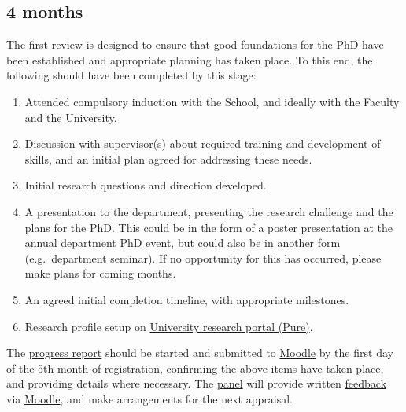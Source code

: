 \documentclass[12pt,a4paper]{article}
\begin{document}
\subsection{4 months} \label{sec:4months}
The first review is designed to ensure that good foundations for the PhD have been established and appropriate planning has taken place. To this end, the following should have been completed by this stage:
\begin{enumerate}
	\item Attended compulsory induction with the School, and ideally with the Faculty and the University.
	\item Discussion with supervisor(s) about required training and development of skills, and an initial plan agreed for addressing these needs.
	\item Initial research questions and direction developed.
	\item A presentation to the department, presenting the research challenge and the plans for the PhD. This could be in the form of a poster presentation at the annual department PhD event, but could also be in another form (e.g.\ department seminar). If no opportunity for this has occurred, please make plans for coming months.
	\item An agreed initial completion timeline, with appropriate milestones.
	\item Research profile setup on \href{https://pure.lancs.ac.uk}{University research portal (Pure)}.
\end{enumerate}

The \hyperref[sec:report]{progress report} should be started and submitted to \href{https://modules.lancaster.ac.uk/course/view.php?id=7050}{Moodle} by the first day of the 5th month of registration, confirming the above items have taken place, and providing details where necessary. The \hyperref[sec:panel]{panel} will provide written \hyperref[sec:feedback]{feedback} via \href{https://modules.lancaster.ac.uk/course/view.php?id=7050}{Moodle}, and make arrangements for the next appraisal.
\end{document}
